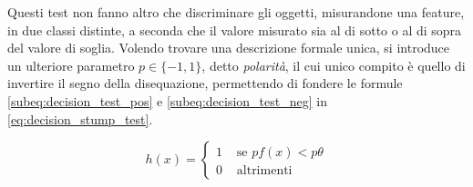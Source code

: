             Questi test non fanno altro che discriminare gli oggetti, misurandone una feature, in due classi distinte, a seconda che il valore misurato sia al di sotto o al di sopra del valore di soglia.
            Volendo trovare una descrizione formale unica, si introduce un ulteriore parametro $p \in \{-1,1\}$, detto \emph{polarità}, il cui unico compito è quello di invertire il segno della disequazione, permettendo di fondere le formule \ref{subeq:decision_test_pos} e \ref{subeq:decision_test_neg} in \ref{eq:decision_stump_test}.

            \begin{equation}
                \label{eq:decision_stump_test}
                h(x) = 
                \begin{cases}
                    1 & \text{ se } pf(x) < p\theta \\
                    0 & \text{ altrimenti }
                \end{cases}
            \end{equation}

